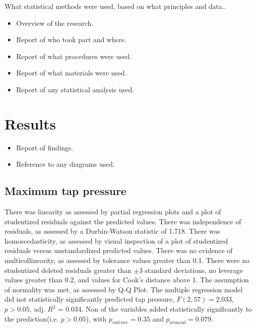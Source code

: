 \documentclass{sigchi}
\begin{document}
What statistical methods were used, based on what principles and data..

\begin{itemize}
  \item Overview of the research.
  \item Report of who took part and where.
  \item Report of what procedures were used.
  \item Report of what materials were used.
  \item Report of any statistical analysis used.
\end{itemize}


\section{Results} %
\label{sec:results}
\begin{itemize}
  \item Report of findings.
  \item Reference to any diagrams used.
\end{itemize}

\subsection{Maximum tap pressure}
There was linearity as assessed by partial regression plots and a plot of studentized residuals against the predicted values. There was independence of residuals, as assessed by a Durbin-Watson statistic of 1.718. There was homoscedasticity, as assessed by visual inspection of a plot of studentized residuals versus unstandardized predicted values. There was no evidence of multicollinearity, as assessed by tolerance values greater than 0.1. There were no studentized deleted residuals greater than $\pm$3 standard deviations, no leverage values greater than 0.2, and values for Cook's distance above 1. The assumption of normality was met, as assessed by Q-Q Plot. The multiple regression model did not statistically significantly predicted tap pressure, $F(2, 57) = 2.033$, $p > 0.05$, adj. $R^2$ = 0.034. Non of the variables added statistically significantly to the prediction(i.e. $p > 0.05$), with $p_{valence} = 0.35$ and $p_{arousal} = 0.079$. %
\end{document}
